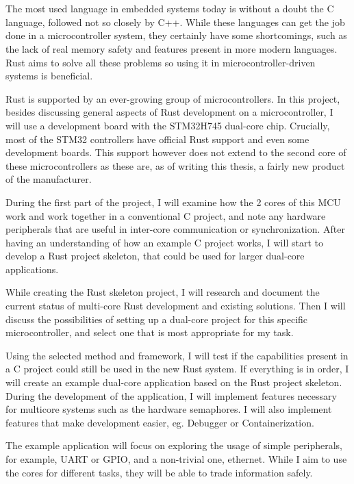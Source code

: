 \chapter{\bevezetes}

The most used language in embedded systems today is without a doubt the C language, followed not so closely by C++. While these languages can get the job done in a microcontroller system, they certainly have some shortcomings, such as the lack of real memory safety and features present in more modern languages. Rust aims to solve all these problems so using it in microcontroller-driven systems is beneficial.

Rust is supported by an ever-growing group of microcontrollers. In this project, besides discussing general aspects of Rust development on a microcontroller, I will use a development board with the STM32H745 dual-core chip. Crucially, most of the STM32 controllers have official Rust support and even some development boards. This support however does not extend to the second core of these microcontrollers as these are, as of writing this thesis, a fairly new product of the manufacturer.

During the first part of the project, I will examine how the 2 cores of this MCU work and work together in a conventional C project, and note any hardware peripherals that are useful in inter-core communication or synchronization. After having an understanding of how an example C project works, I will start to develop a Rust project skeleton, that could be used for larger dual-core applications.

While creating the Rust skeleton project, I will research and document the current status of multi-core Rust development and existing solutions. Then I will discuss the possibilities of setting up a dual-core project for this specific microcontroller, and select one that is most appropriate for my task.

Using the selected method and framework, I will test if the capabilities present in a C project could still be used in the new Rust system. If everything is in order, I will create an example dual-core application based on the Rust project skeleton. During the development of the application, I will implement features necessary for multicore systems such as the hardware semaphores. I will also implement features that make development easier, eg. Debugger or Containerization.

The example application will focus on exploring the usage of simple peripherals, for example, UART or GPIO, and a non-trivial one, ethernet. While I aim to use the cores for different tasks, they will be able to trade information safely.
